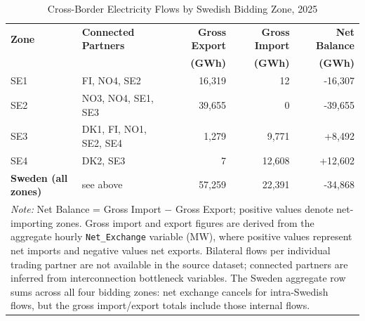 \begin{table}[htbp]
\centering
\caption{Cross-Border Electricity Flows by Swedish Bidding Zone, 2025}
\label{tab:cross_border_flows_2025}
\begin{tabular}{llrrr}
\toprule
\textbf{Zone} & \textbf{Connected Partners} & \textbf{Gross Export} & \textbf{Gross Import} & \textbf{Net Balance} \\
& & \textbf{(GWh)} & \textbf{(GWh)} & \textbf{(GWh)} \\
\midrule
SE1 & FI, NO4, SE2 & 16,319 & 12 & -16,307 \\
SE2 & NO3, NO4, SE1, SE3 & 39,655 & 0 & -39,655 \\
SE3 & DK1, FI, NO1, SE2, SE4 & 1,279 & 9,771 & +8,492 \\
SE4 & DK2, SE3 & 7 & 12,608 & +12,602 \\
\midrule
\textbf{Sweden (all zones)} & see above & 57,259 & 22,391 & -34,868 \\
\bottomrule
\multicolumn{5}{p{0.97\linewidth}}{\footnotesize
  \textit{Note:} Net Balance = Gross Import $-$ Gross Export; positive values denote net-importing zones. Gross import and export figures are derived from the aggregate hourly \texttt{Net\_Exchange} variable (MW), where positive values represent net imports and negative values net exports. Bilateral flows per individual trading partner are not available in the source dataset; connected partners are inferred from interconnection bottleneck variables. The Sweden aggregate row sums across all four bidding zones: net exchange cancels for intra-Swedish flows, but the gross import/export totals include those internal flows.}
\end{tabular}
\end{table}